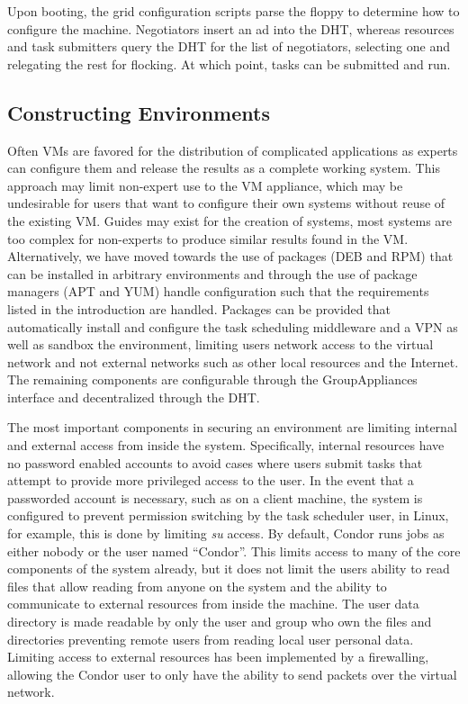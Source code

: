 \documentclass{sig-alternate}
\begin{document}
Upon booting, the grid configuration scripts parse the floppy to determine how
to configure the machine.  Negotiators insert an ad into the DHT, whereas
resources and task submitters query the DHT for the list of negotiators,
selecting one and relegating the rest for flocking.  At which point, tasks
can be submitted and run.

\subsection{Constructing Environments}
Often VMs are favored for the distribution of complicated applications as
experts can configure them and release the results as a complete working system.
This approach may limit non-expert use to the VM appliance, which may be
undesirable for users that want to configure their own systems without reuse
of the existing VM.  Guides may exist for the creation of systems, most
systems are too complex for non-experts to produce similar results found in the
VM.  Alternatively, we have moved towards the use of packages (DEB and RPM)
that can be installed in arbitrary environments and through the use of package
managers (APT and YUM) handle configuration such that the requirements listed
in the introduction are handled.  Packages can be provided that automatically
install and configure the task scheduling middleware and a VPN as well as
sandbox the environment, limiting users network access to the virtual network
and not external networks such as other local resources and the Internet.  The
remaining components are configurable through the GroupAppliances interface and
decentralized through the DHT.

The most important components in securing an environment are limiting internal
and external access from inside the system.  Specifically, internal resources
have no password enabled accounts to avoid cases where users submit tasks that
attempt to provide more privileged access to the user.  In the event that a
passworded account is necessary, such as on a client machine, the system is
configured to prevent permission switching by the task scheduler user, in
Linux, for example, this is done by limiting \textit{su} access.  By default,
Condor runs jobs as either nobody or the user named ``Condor''.  This limits
access to many of the core components of the system already, but it does not
limit the users ability to read files that allow reading from anyone on the
system and the ability to communicate to external resources from inside the
machine.  The user data directory is made readable by only the user and group
who own the files and directories preventing remote users from reading local
user personal data.  Limiting access to external resources has been implemented
by a firewalling, allowing the Condor user to only have the ability to send
packets over the virtual network.
\end{document}
